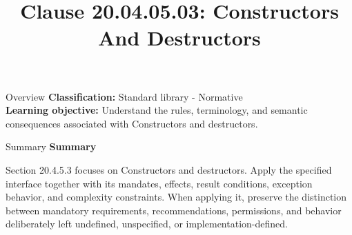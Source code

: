 \documentclass[10pt,letterpaper]{article}
\title{Clause 20.04.05.03: Constructors And Destructors}
\author{}
\date{}
\begin{document}
\maketitle
\begin{CornellOverviewBox}{Overview}
\textbf{Classification:} Standard library - Normative\\[2pt]
\textbf{Learning objective:} Understand the rules, terminology, and semantic consequences associated with Constructors and destructors.
\end{CornellOverviewBox}\begin{CornellSummaryBox}{Summary}
{\sffamily\bfseries\color{Accent} Summary}\par\vspace{3pt}Section 20.4.5.3 focuses on Constructors and destructors. Apply the specified interface together with its mandates, effects, result conditions, exception behavior, and complexity constraints. When applying it, preserve the distinction between mandatory requirements, recommendations, permissions, and behavior deliberately left undefined, unspecified, or implementation-defined.
\end{CornellSummaryBox}
\end{document}
